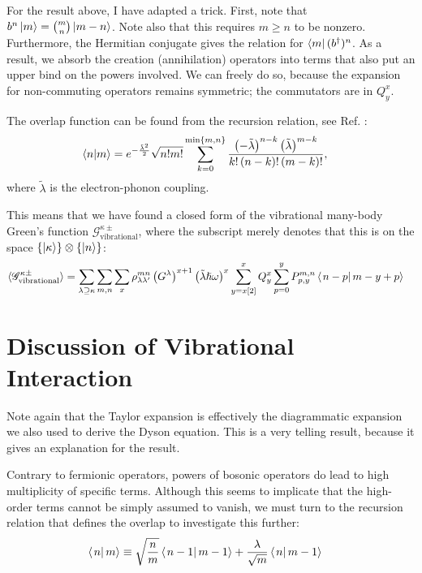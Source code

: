 For the result above, I have adapted a trick. First, note that $b^n \ket{m} = \binom{m}{n} \ket{m-n}$. Note also that this requires $m\geq n$ to be nonzero. Furthermore, the Hermitian conjugate gives the relation for $\bra{m} (b^\dagger)^n$. As a result, we absorb the creation (annihilation) operators into terms that also put an upper bind on the powers involved. We can freely do so, because the expansion for non-commuting operators remains symmetric; the commutators are in $Q^x_y$. 


The overlap function can be found from the recursion relation, see Ref. \cite{kaspermothpoulsen}:
\begin{align*}
\braket{n|m} &= e^{-\frac{\tilde{\lambda}^2}{2}} \sqrt{n! m!} \sum_{k=0}^{ \text{min}\left\{ m, n \right\}} \frac{ \left(-\tilde{\lambda}\right)^{n-k} \left(\tilde{\lambda}\right)^{m-k}}{ k! \left( n -k\right)! \left( m - k \right)!},
\end{align*} 
where $\tilde{\lambda}$ is the electron-phonon coupling.

This means that we have found a closed form of the vibrational many-body Green's function $\mathscr{G}^{\kappa\pm}_\text{vibrational}$, where the subscript merely denotes that this is on the space $\left\{\ket{\kappa}\right\} \otimes \left\{\ket{n}\right\}$:
\begin{align}
\braket{\mathscr{G}^{\kappa\pm}_\text{vibrational}}&= \sum_{\lambda\supseteq \kappa} \sum_{m,n} \sum_x\rho_{\lambda\lambda^\prime}^{mn}  \left(G^\lambda \right)^{x+1} \left(\tilde{\lambda}\hslash\omega\right)^x
 \sum_{y=x[2]}^x Q^x_y \sum_{p=0}^{y} P^{m,n}_{p,y} \braket{\left. n-p \right| m-y+p} \label{eq:vibgf}
\end{align}

\section{Discussion of Vibrational Interaction}
\label{sec:phononicdiscussion}

Note again that the Taylor expansion is effectively the diagrammatic expansion we also used to derive the Dyson equation. This is a very telling result, because it gives an explanation for the result.

Contrary to fermionic operators, powers of bosonic operators do lead to high multiplicity of specific terms. Although this seems to implicate that the high-order terms cannot be simply assumed to vanish, we must turn to the recursion relation that defines the overlap to investigate this further:
\begin{align*}
\braket{\left. n\right|m} &\equiv \sqrt{\frac{n}{m}} \braket{\left. n-1\right|m-1} + \frac{\lambda}{\sqrt{m}} \braket{\left. n\right|m-1}
\end{align*}


